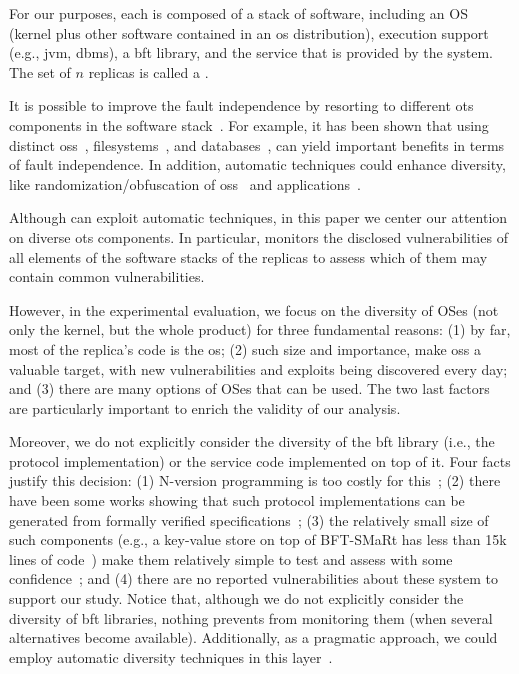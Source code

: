 For our purposes, each \replica is composed of a stack of software, including an OS (kernel plus other software contained in an \gls{os} distribution), execution support (e.g., \gls{jvm}, \gls{dbms}), a \gls{bft} library, and the service that is provided by the system.
The set of $n$ replicas is called a \configuration.

It is possible to improve the \replicas fault independence by resorting to different \gls{ots} components in the software stack~\cite{Deswarte:1998}. 
For example, it has been shown that using distinct \glspl{os}~\cite{Garcia:2014}, filesystems~\cite{Rodrigues:2001,Bairavasundaram:2009,Alagappan:2016}, and databases~\cite{Gashi:2007}, can yield important benefits in terms of fault independence. In addition, automatic techniques could enhance diversity, like randomization/obfuscation of \glspl{os}~\cite{Roeder:2010} and applications~\cite{King:2016}.

Although \system can exploit automatic techniques, in this paper we center our attention on diverse \gls{ots} components. 
In particular, \system monitors the disclosed vulnerabilities of all elements of the software stacks of the replicas to assess which of them may contain common vulnerabilities.  

However, in the experimental evaluation, we focus on the diversity of OSes (not only the kernel, but the whole product) for three fundamental reasons: (1) by far, most of the replica’s code is the \gls{os}; (2) such size and importance, make \glspl{os} a valuable target, with new vulnerabilities and exploits being discovered every day; and (3) there are many options of OSes that can be used.
The two last factors are particularly important to enrich the validity of our analysis.

Moreover, we do not explicitly consider the diversity of the \gls{bft} library (i.e., the protocol implementation) or the service code implemented on top of it.
Four facts justify this decision: (1) N-version programming is too costly for this~\cite{Avizienis:1977}; (2) there have been some works showing that such protocol implementations can be generated from formally verified specifications~\cite{Hawblitzel:2015,Rahli:2018}; (3) the relatively small size of such components (e.g., a key-value store on top of BFT-SMaRt has less than 15k lines of code~\cite{Bessani:2014}) make them relatively simple to test and assess with some confidence~\cite{Martins:2013,Lee:2014};  and (4) there are no reported vulnerabilities about these system to support our study.
Notice that, although we do not explicitly consider the diversity of \gls{bft} libraries, nothing prevents \system from monitoring them (when several alternatives become available). 
Additionally, as a pragmatic approach, we could employ automatic diversity techniques in this layer~\cite{Platania:2014,Roeder:2010}.




